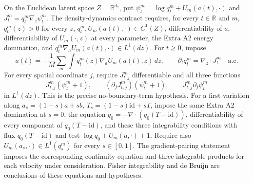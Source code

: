 \documentclass[11pt,a4paper]{report}
\begin{document}
On the Euclidean latent space \(Z=\mathbb R^{d_z}\), put \(\psi_t^m=\log q_t^m+U_m(a(t),\cdot)\) and \(J_t^m=q_t^m\nabla_z\psi_t^m\). The density-dynamics contract requires, for every \(t\in\mathbb R\) and \(m\), \(q_t^m(z)>0\) for every \(z\), \(q_t^m,U_m(a(t),\cdot)\in C^1(Z)\), differentiability of \(a\), differentiability of \(U_m(\cdot,z)\) at every parameter, the Extra A2 energy domination, and \(q_t^m\nabla_aU_m(a(t),\cdot)\in L^1(dz)\). For \(t\ge0\), impose
        \[\dot a(t)=-\frac1M\sum_m\int q_t^m(z)\nabla_aU_m(a(t),z)\,dz,
          \qquad \partial_tq_t^m=\nabla_z\!\cdot J_t^m\quad\text{a.e.}\]
        For every spatial coordinate \(j\), require \(J_{t,j}^m\) differentiable and all three functions
        \[J_{t,j}^m(\psi_t^m+1),\qquad
          (\partial_jJ_{t,j}^m)(\psi_t^m+1),\qquad
          J_{t,j}^m\partial_j\psi_t^m\]
        in \(L^1(dz)\). This is the precise no-boundary-term hypothesis. For a first variation along \(a_s=(1-s)a+sb\), \(T_s=(1-s)\mathrm{id}+sT\), impose the same Extra A2 domination at \(s=0\), the equation \(\dot q_0=-\nabla\cdot(q_0(T-\mathrm{id}))\), differentiability of every component of \(q_0(T-\mathrm{id})\), and these three integrability conditions with flux \(q_0(T-\mathrm{id})\) and test \(\log q_0+U_m(a,\cdot)+1\). Require also \(U_m(a_s,\cdot)\in L^1(q_s^m)\) for every \(s\in[0,1]\). The gradient-pairing statement imposes the corresponding continuity equation and three integrable products for each velocity under consideration. Fisher integrability and de Bruijn are conclusions of these equations and hypotheses.
\end{document}
